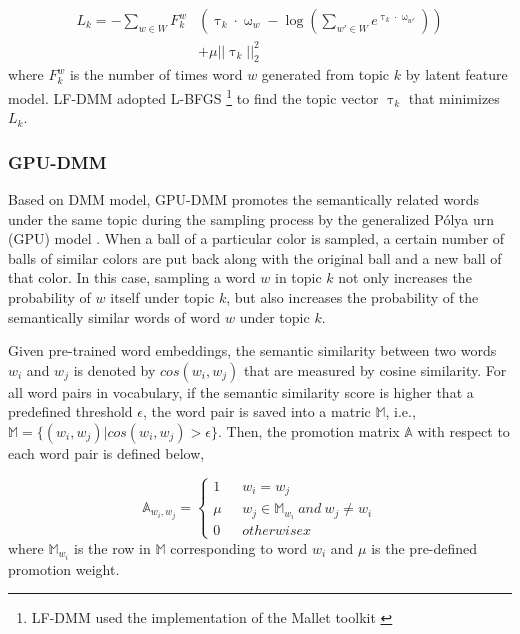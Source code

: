 \documentclass[10pt,journal,compsoc]{IEEEtran}
\begin{document}
\begin{equation} \label{lfdmm_mle}
\begin{split}
L_k = - \sum_{w\in W} F_k^w & (\uptau_k \cdot \upomega_w - \log(\sum_{w'\in W}e^{\uptau_k\cdot\upomega_{w'}})) \\ 
& + \mu||\uptau_k||_2^2
\end{split}
\end{equation}
where $F_k^w$ is the number of times word $w$ generated from topic $k$ by latent feature model. LF-DMM adopted L-BFGS \footnote{LF-DMM used the implementation of the Mallet toolkit \cite{mccallum2002mallet}} \cite{liu1989limited} to find the topic vector $\uptau_k$ that minimizes $L_k$.



\subsubsection{GPU-DMM}

Based on DMM model, GPU-DMM \cite{li2016topic} promotes the semantically related words under the same topic during the sampling process by the generalized P\'{o}lya urn (GPU) model \cite{mahmoud2008polya}. When a ball of a particular color is sampled, a certain number of balls of similar colors are put back along with the original ball and a new ball of that color. In this case, sampling a word $w$ in topic $k$ not only increases the probability of $w$ itself under topic $k$, but also increases the probability of the semantically similar words of word $w$ under topic $k$.

Given pre-trained word embeddings, the semantic similarity between two words $w_i$ and $w_j$ is denoted by $cos(w_i,w_j)$ that are measured by cosine similarity. For all word pairs in vocabulary, if the semantic similarity score is higher that a predefined threshold $\epsilon$, the word pair is saved into a matric $\mathbb{M}$, i.e., $\mathbb{M}=\{(w_i,w_j)|cos(w_i,w_j)>\epsilon\}$. Then, the promotion matrix $\mathbb{A}$ with respect to each word pair is defined below,

\begin{equation} \label{gpudmm_pro}
\mathbb{A}_{w_i,w_j}=
\begin{cases}
  1  & \ \ \ w_i=w_j \\
  \mu   &  \ \ \ w_j \in \mathbb{M}_{w_i} \ and \ w_j \neq w_i \\
  0  & \ \ \ otherwise x
\end{cases}
\end{equation}
where $\mathbb{M}_{w_i}$ is the row in $\mathbb{M}$ corresponding to word $w_i$ and $\mu$ is the pre-defined promotion weight.
\end{document}
